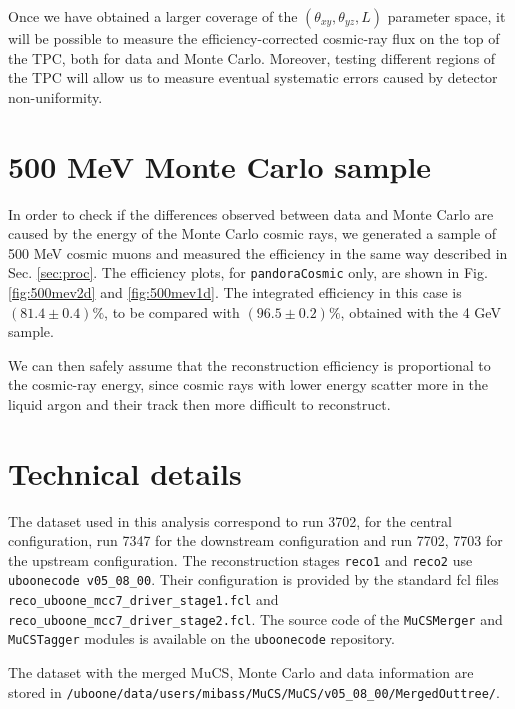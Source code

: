 \documentclass[a4paper]{scrartcl}
\begin{document}
Once we have obtained a larger coverage of the $(\theta_{xy}, \theta_{yz}, L)$ parameter space, it will be possible to measure the efficiency-corrected cosmic-ray flux on the top of the TPC, both for data and Monte Carlo. Moreover, testing different regions of the TPC will allow us to measure eventual systematic errors caused by detector non-uniformity.

\appendix

\section{500 MeV Monte Carlo sample}\label{sec:500mev}
In order to check if the differences observed between data and Monte Carlo are caused by the energy of the Monte Carlo cosmic rays, we generated a sample of 500 MeV cosmic muons and measured the efficiency in the same way described in Sec. \ref{sec:proc}. The efficiency plots, for \texttt{pandoraCosmic} only, are shown in Fig. \ref{fig:500mev2d} and \ref{fig:500mev1d}. The integrated efficiency in this case is $(81.4 \pm 0.4) \%$, to be compared with $(96.5 \pm 0.2) \%$, obtained with the 4 GeV sample.

We can then safely assume that the reconstruction efficiency is proportional to the cosmic-ray energy, since cosmic rays with lower energy scatter more in the liquid argon and their track then more difficult to reconstruct.

\clearpage{}
\section{Technical details}
The dataset used in this analysis correspond to run 3702, for the central configuration, run 7347 for the downstream configuration and run 7702, 7703 for the upstream configuration. The reconstruction stages \texttt{reco1} and \texttt{reco2} use \texttt{uboonecode v05\_08\_00}. Their configuration is provided by the standard fcl files \texttt{reco\_uboone\_mcc7\_driver\_stage1.fcl} and \texttt{reco\_uboone\_mcc7\_driver\_stage2.fcl}. The source code of the \texttt{MuCSMerger} and \texttt{MuCSTagger} modules is available on the \texttt{uboonecode} repository.

The dataset with the merged MuCS, Monte Carlo and data information are stored in \texttt{/uboone/data/users/mibass/MuCS/MuCS/v05\_08\_00/MergedOuttree/}.
\end{document}

